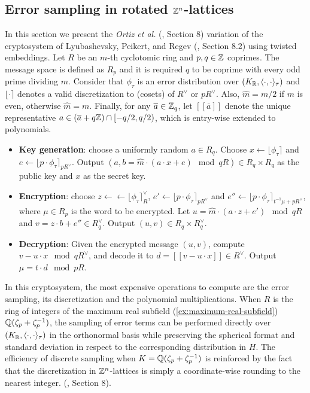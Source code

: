 \documentclass[a4paper,12pt]{article}
\begin{document}
\subsection{Error sampling in rotated \(\mathbb{Z}^n\)-lattices}
\label{sec:orgc7d6d33}

\begin{text}
  In this section we present the \textit{Ortiz et al.} (\cite{Ortiz2021}, Section 8)
  variation of the cryptosystem of Lyubashevsky, Peikert, and Regev
  (\cite{LPV2013}, Section 8.2) using twisted embeddings. Let $R$ be an $m$-th
  cyclotomic ring and $p, q \in \mathbb{Z}$ coprimes. The message space is defined as
  $R_p$ and it is required $q$ to be coprime with every odd prime dividing
  $m$. Consider that $\phi_\tau$ is an error distribution over $(K_{\mathbb{R}},\langle{\cdot,\cdot}\rangle_\tau)$
  and $\lfloor{\cdot}\rceil$ denotes a valid discretization to (cosets) of $R^\vee$ or $pR^\vee$.
  Also, $\hat{m} = m/2$ if $m$ is even, otherwise $\hat{m} = m$. Finally, for any
  $\overline{a} \in \mathbb{Z}_q$, let $[[\overline{a}]]$ denote the unique representative
  $a \in (\overline{a} + q\mathbb{Z}) \cap [-q/2, q/2)$, which is entry-wise extended to
  polynomials.

  \begin{itemize}
  \item \textbf{Key generation}: choose a uniformly random $a \in R_q$. Choose $x
    \longleftarrow \lfloor{\phi_\tau}\rceil$ and $e \longleftarrow \lfloor{p \cdot \phi_\tau}\rceil_{pR^\vee}$. Output $(a,b = \hat{m}\cdot(a \cdot x + e)
    \mod{qR} ) \in R_q \times R_q$ as the public key and $x$ as the secret key.
  \item \textbf{Encryption}: choose $z \longleftarrow \longleftarrow \lfloor{\phi_\tau}\rceil_R^\vee$, $e' \longleftarrow \lfloor{p \cdot
      \phi_\tau}\rceil_{pR^\vee}$ and  $e'' \longleftarrow \lfloor{p \cdot \phi_\tau}\rceil_{t^{-1}\mu +pR^\vee}$, where $\mu \in R_p$ is
    the word to be encrypted. Let $u = \hat{m} \cdot (a \cdot z + e') \mod{qR}$ and $v =
    z \cdot b + e'' \in R_q^\vee$. Output $(u,v) \in R_q \times R^\vee_q$.
  \item \textbf{Decryption}: Given the encrypted message $(u,v)$, compute $v - u
    \cdot x \mod{qR^\vee}$, and decode it to $d = [[v - u \cdot x]] \in R^\vee$. Output $\mu = t \cdot
    d \mod{pR}$. 
  \end{itemize}

  In this cryptosystem, the most expensive operations to compute are the error sampling, its discretization and the polynomial multiplications. When $R$ is
  the ring of integers of the maximum real subfield
  (\ref{ex:maximum-real-subfield}) $\mathbb{Q}(\zeta_{p} + \zeta_{p} ^{-1})$, the sampling of error terms can be performed directly over $(K_{\mathbb{R}}, \langle{\cdot,\cdot}\rangle_\tau)$ in the orthonormal basis while preserving the spherical format and standard deviation in respect to the corresponding distribution in $H$. The efficiency
of discrete sampling when $K = \mathbb{Q}(\zeta_p + \zeta_p^{-1})$ is reinforced by the fact
that the discretization in $\mathbb{Z}^n$-lattices is simply a coordinate-wise rounding to the nearest integer. (\cite{Ortiz2021}, Section 8).
\end{text}
\end{document}
